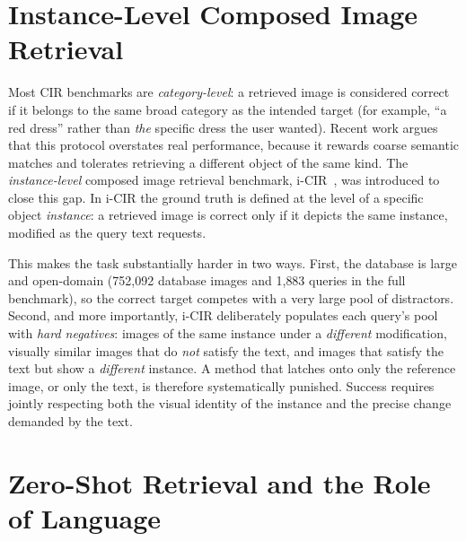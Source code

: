 \section{Instance-Level Composed Image Retrieval}\label{sect:intro_icir}

Most CIR benchmarks are \emph{category-level}: a retrieved image is considered
correct if it belongs to the same broad category as the intended target (for
example, ``a red dress'' rather than \emph{the} specific dress the user
wanted). Recent work argues that this protocol overstates real performance,
because it rewards coarse semantic matches and tolerates retrieving a
different object of the same kind. The \emph{instance-level} composed image
retrieval benchmark, i-CIR~\cite{psomas2025icir}, was introduced to close this
gap. In i-CIR the ground truth is defined at the level of a specific object
\emph{instance}: a retrieved image is correct only if it depicts the same
instance, modified as the query text requests.

This makes the task substantially harder in two ways. First, the database is
large and open-domain (752{,}092 database images and 1{,}883 queries in the
full benchmark), so the correct target competes with a very large pool of
distractors. Second, and more importantly, i-CIR deliberately populates each
query's pool with \emph{hard negatives}: images of the same instance under a
\emph{different} modification, visually similar images that do \emph{not}
satisfy the text, and images that satisfy the text but show a \emph{different}
instance. A method that latches onto only the reference image, or only the
text, is therefore systematically punished. Success requires jointly
respecting both the visual identity of the instance and the precise change
demanded by the text.

\section{Zero-Shot Retrieval and the Role of Language}\label{sect:intro_gap}

